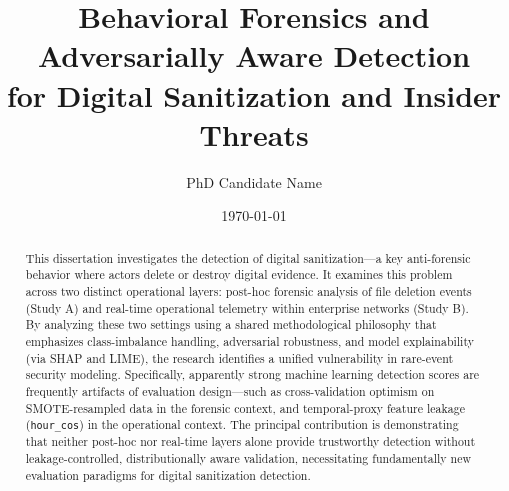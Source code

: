 \documentclass[12pt,a4paper]{report}
\title{Behavioral Forensics and Adversarially Aware Detection \\ for Digital Sanitization and Insider Threats}
\author{PhD Candidate Name}
\date{\today}
\begin{document}
\maketitle

\begin{abstract}
This dissertation investigates the detection of digital sanitization---a key anti-forensic behavior where actors delete or destroy digital evidence. It examines this problem across two distinct operational layers: post-hoc forensic analysis of file deletion events (Study A) and real-time operational telemetry within enterprise networks (Study B). By analyzing these two settings using a shared methodological philosophy that emphasizes class-imbalance handling, adversarial robustness, and model explainability (via SHAP and LIME), the research identifies a unified vulnerability in rare-event security modeling. Specifically, apparently strong machine learning detection scores are frequently artifacts of evaluation design---such as cross-validation optimism on SMOTE-resampled data in the forensic context, and temporal-proxy feature leakage (\texttt{hour\_cos}) in the operational context. The principal contribution is demonstrating that neither post-hoc nor real-time layers alone provide trustworthy detection without leakage-controlled, distributionally aware validation, necessitating fundamentally new evaluation paradigms for digital sanitization detection.
\end{abstract}

\tableofcontents
\listoffigures
\listoftables











\end{document}
